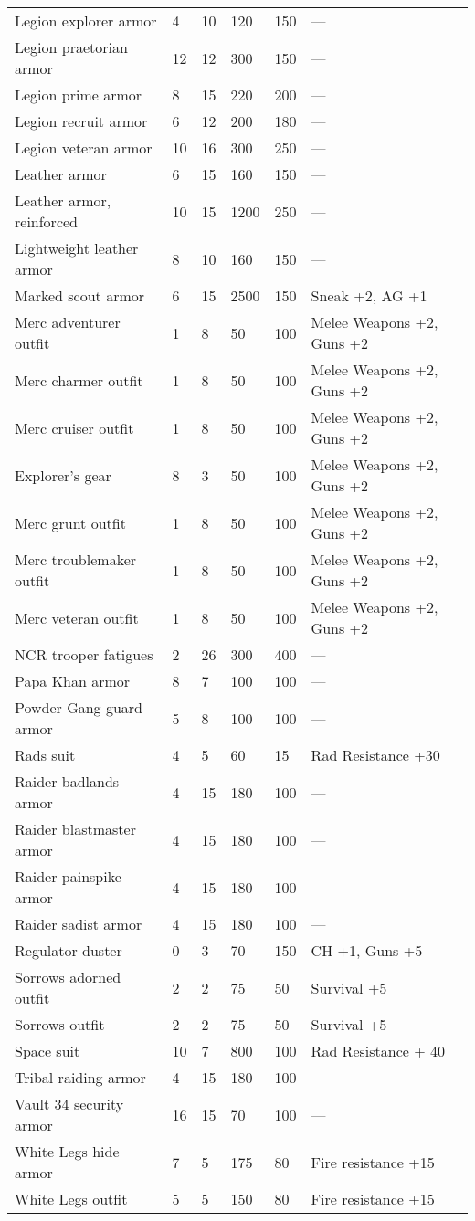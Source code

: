 \begin{longtable}{|p{5cm}|p{0.9cm}|p{1.2cm}|p{1.2cm}|p{1.2cm}|p{5.5cm}|}
Legion explorer armor & 4 & 10 & 120 & 150 & — \\
Legion praetorian armor & 12 & 12 & 300 & 150 & — \\
Legion prime armor & 8 & 15 & 220 & 200 & — \\
Legion recruit armor & 6 & 12 & 200 & 180 & — \\
Legion veteran armor & 10 & 16 & 300 & 250 & — \\
Leather armor & 6 & 15 & 160 & 150 & — \\
Leather armor, reinforced & 10 & 15 & 1200 & 250 & — \\
Lightweight leather armor & 8 & 10 & 160 & 150 & — \\
Marked scout armor & 6 & 15 & 2500 & 150 & Sneak +2, AG +1 \\
Merc adventurer outfit & 1 & 8 & 50 & 100 & Melee Weapons +2, Guns +2 \\
Merc charmer outfit & 1 & 8 & 50 & 100 & Melee Weapons +2, Guns +2 \\
Merc cruiser outfit & 1 & 8 & 50 & 100 & Melee Weapons +2, Guns +2 \\
Explorer's gear & 8 & 3 & 50 & 100 & Melee Weapons +2, Guns +2 \\
Merc grunt outfit & 1 & 8 & 50 & 100 & Melee Weapons +2, Guns +2 \\
Merc troublemaker outfit & 1 & 8 & 50 & 100 & Melee Weapons +2, Guns +2 \\
Merc veteran outfit & 1 & 8 & 50 & 100 & Melee Weapons +2, Guns +2 \\
NCR trooper fatigues & 2 & 26 & 300 & 400 & — \\
Papa Khan armor & 8 & 7 & 100 & 100 & — \\
Powder Gang guard armor & 5 & 8 & 100 & 100 & — \\
Rads suit & 4 & 5 & 60 & 15 & Rad Resistance +30 \\
Raider badlands armor & 4 & 15 & 180 & 100 & — \\
Raider blastmaster armor & 4 & 15 & 180 & 100 & — \\
Raider painspike armor & 4 & 15 & 180 & 100 & — \\
Raider sadist armor & 4 & 15 & 180 & 100 & — \\
Regulator duster & 0 & 3 & 70 & 150 & CH +1, Guns +5 \\
Sorrows adorned outfit & 2 & 2 & 75 & 50 & Survival +5 \\
Sorrows outfit & 2 & 2 & 75 & 50 & Survival +5 \\
Space suit & 10 & 7 & 800 & 100 & Rad Resistance + 40 \\
Tribal raiding armor & 4 & 15 & 180 & 100 & — \\
Vault 34 security armor & 16 & 15 & 70 & 100 & — \\
White Legs hide armor & 7 & 5 & 175 & 80 & Fire resistance +15 \\
White Legs outfit & 5 & 5 & 150 & 80 & Fire resistance +15 \\
\hline
\end{longtable}
